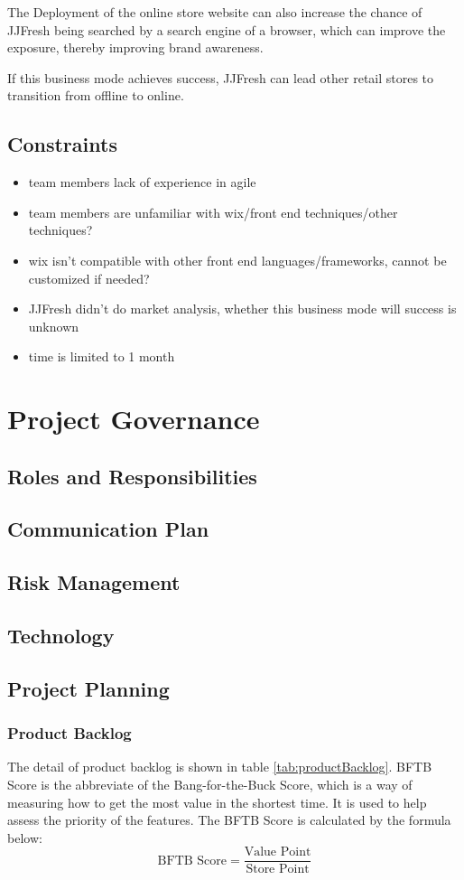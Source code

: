 \documentclass{report}
\begin{document}
The Deployment of the online store website can also increase the chance of JJFresh being searched by a search engine of a browser, which can improve the exposure, thereby improving brand awareness.

If this business mode achieves success, JJFresh can lead other retail stores to transition from offline to online.
\section{Constraints}
\begin{itemize}
  \item team members lack of experience in agile
  \item team members are unfamiliar with wix/front end techniques/other techniques?
  \item wix isn't compatible with other front end languages/frameworks, cannot be customized if needed?
  \item JJFresh didn't do market analysis, whether this business mode will success is unknown
  \item time is limited to 1 month
\end{itemize}

\chapter{Project Governance}
\section{Roles and Responsibilities}
\section{Communication Plan}
\section{Risk Management}
\section{Technology}
\section{Project Planning}
\subsection{Product Backlog}
The detail of product backlog is shown in table \ref{tab:productBacklog}. BFTB Score is the abbreviate of the Bang-for-the-Buck Score, which is a way of measuring how to get the most value in the shortest time. It is used to help assess the priority of the features. The BFTB Score is calculated by the formula below:
$$
  \text{BFTB Score} = \frac{\text{Value Point}}{\text{Store Point}}
$$
\end{document}

